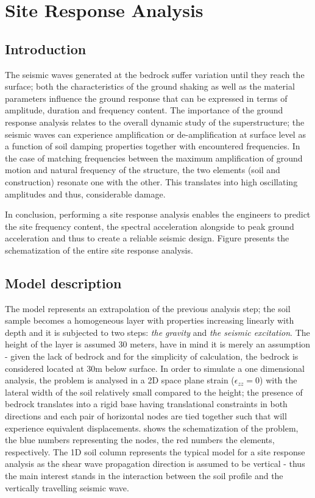 	\chapter {Site Response Analysis}
	\section{Introduction}
	The seismic waves generated at the bedrock suffer variation until they reach the surface; both the characteristics of the ground shaking as well as the material parameters influence the ground response that can be expressed in terms of amplitude, duration and frequency content. The importance of the ground response analysis relates to the overall dynamic study of the superstructure; the seismic waves can experience amplification or de-amplification at surface level as a function of soil damping properties together with encountered frequencies. In the case of matching frequencies between the maximum amplification of ground motion and natural frequency of the structure, the two elements (soil and construction) resonate one with the other. This translates into high \mbox{oscillating} amplitudes and thus, considerable damage. 
	
	In conclusion, performing a site response analysis enables the engineers to predict the site frequency content, the spectral acceleration alongside to peak ground acceleration and thus to create a reliable seismic design. Figure \label{Soilcolumn} presents the schematization of the entire site response analysis.
	
	
	\section{Model description}
	The model represents an extrapolation of the previous analysis step; the soil sample becomes a homogeneous layer with properties increasing linearly with depth and it is subjected to two steps: \textit{the gravity} and \textit{the seismic excitation}. The height of the layer is assumed 30 meters, have in mind it is merely an assumption - given the lack of bedrock and for the simplicity of calculation, the bedrock is considered located at 30m below surface. In order to simulate a one dimensional analysis, the problem is analysed in a 2D space plane strain ($\epsilon_{zz}=0$) with the lateral width of the soil relatively small compared to the height; the presence of bedrock translates into a rigid base having translational constraints in both directions and each pair of horizontal nodes are tied together such that will experience equivalent displacements. \label{fig:Soilcolumn} shows the schematization of the problem, the blue numbers representing the nodes, the red numbers the elements, respectively. The 1D soil column represents the typical model for a site response analysis as the shear wave propagation direction is assumed to be vertical - thus the main interest stands in the interaction between the soil profile and the vertically travelling seismic wave. 
	
